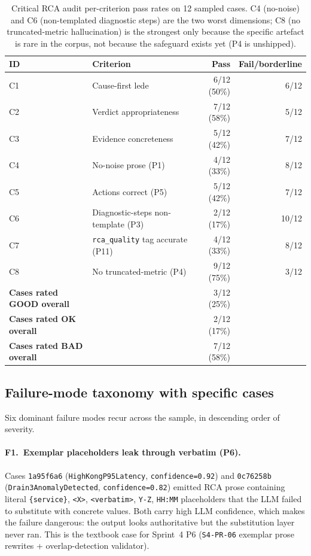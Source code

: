 \documentclass[11pt,a4paper,oneside]{report}
\begin{document}
\begin{table}[h]
\centering
\small
\begin{tabular}{llrr}
\toprule
\textbf{ID} & \textbf{Criterion} & \textbf{Pass} & \textbf{Fail/borderline} \\
\midrule
C1 & Cause-first lede           &  6/12 (50\%) & 6/12 \\
C2 & Verdict appropriateness    &  7/12 (58\%) & 5/12 \\
C3 & Evidence concreteness      &  5/12 (42\%) & 7/12 \\
C4 & No-noise prose (P1)        &  4/12 (33\%) & 8/12 \\
C5 & Actions correct (P5)       &  5/12 (42\%) & 7/12 \\
C6 & Diagnostic-steps non-template (P3) & 2/12 (17\%) & 10/12 \\
C7 & \texttt{rca\_quality} tag accurate (P11) & 4/12 (33\%) & 8/12 \\
C8 & No truncated-metric (P4)   &  9/12 (75\%) & 3/12 \\
\midrule
\textbf{Cases rated GOOD overall}     & & 3/12 (25\%) & \\
\textbf{Cases rated OK overall}       & & 2/12 (17\%) & \\
\textbf{Cases rated BAD overall}      & & 7/12 (58\%) & \\
\bottomrule
\end{tabular}
\caption{Critical RCA audit per-criterion pass rates on 12 sampled
cases.  C4 (no-noise) and C6 (non-templated diagnostic steps) are
the two worst dimensions; C8 (no truncated-metric hallucination) is
the strongest only because the specific artefact is rare in the
corpus, not because the safeguard exists yet (P4 is unshipped).}
\label{tab:critical-rca}
\end{table}

\subsection{Failure-mode taxonomy with specific cases}

Six dominant failure modes recur across the sample, in descending
order of severity.

\paragraph{F1.~Exemplar placeholders leak through verbatim (P6).}
Cases \texttt{1a95f6a6} (\texttt{HighKongP95Latency},
\texttt{confidence=0.92}) and \texttt{0c76258b}
(\texttt{Drain3AnomalyDetected}, \texttt{confidence=0.82}) emitted
RCA prose containing literal \texttt{\{service\}}, \texttt{<X>},
\texttt{<verbatim>}, \texttt{Y-Z}, \texttt{HH:MM} placeholders
that the LLM failed to substitute with concrete values.  Both
carry high LLM confidence, which makes the failure dangerous: the
output looks authoritative but the substitution layer never ran.
This is the textbook case for Sprint~4 P6
(\texttt{S4-PR-06} exemplar prose rewrites + overlap-detection
validator).
\end{document}
